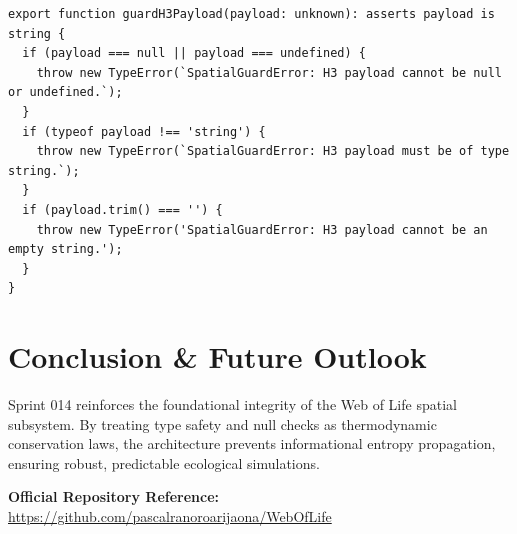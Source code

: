 \documentclass[11pt, a4paper]{article}
\begin{document}
\begin{lstlisting}
export function guardH3Payload(payload: unknown): asserts payload is string {
  if (payload === null || payload === undefined) {
    throw new TypeError(`SpatialGuardError: H3 payload cannot be null or undefined.`);
  }
  if (typeof payload !== 'string') {
    throw new TypeError(`SpatialGuardError: H3 payload must be of type string.`);
  }
  if (payload.trim() === '') {
    throw new TypeError('SpatialGuardError: H3 payload cannot be an empty string.');
  }
}
\end{lstlisting}

\section{Conclusion \& Future Outlook}
Sprint 014 reinforces the foundational integrity of the Web of Life spatial subsystem. By treating type safety and null checks as thermodynamic conservation laws, the architecture prevents informational entropy propagation, ensuring robust, predictable ecological simulations.

\vspace{1em}
\noindent\textbf{Official Repository Reference:} \url{https://github.com/pascalranoroarijaona/WebOfLife}
\end{document}
